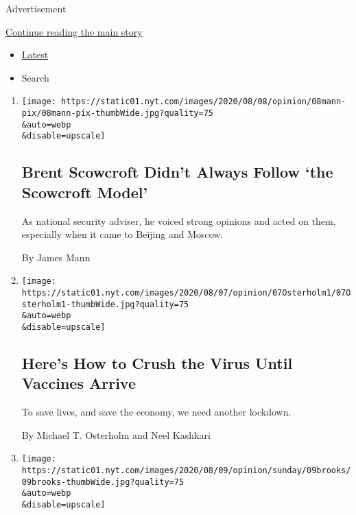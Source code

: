 Advertisement

\protect\hyperlink{after-mid1}{Continue reading the main story}

\begin{itemize}
\tightlist
\item
  \protect\hyperlink{stream-panel}{Latest}
\item
  Search
\end{itemize}

\begin{enumerate}
\def\labelenumi{\arabic{enumi}.}
\item
  \href{/2020/08/08/opinion/brent-scowcroft-model-foreign-policy.html}{}

  \texttt{[image: https://static01.nyt.com/images/2020/08/08/opinion/08mann-pix/08mann-pix-thumbWide.jpg?quality=75\\\&auto=webp\\\&disable=upscale]}

  \hypertarget{brent-scowcroft-didnt-always-follow-the-scowcroft-model}{%
  \subsection{Brent Scowcroft Didn't Always Follow `the Scowcroft
  Model'}\label{brent-scowcroft-didnt-always-follow-the-scowcroft-model}}

  As national security adviser, he voiced strong opinions and acted on
  them, especially when it came to Beijing and Moscow.

  By James Mann
\item
  \href{/2020/08/07/opinion/coronavirus-lockdown-unemployment-death.html}{}

  \texttt{[image: https://static01.nyt.com/images/2020/08/07/opinion/07Osterholm1/07Osterholm1-thumbWide.jpg?quality=75\\\&auto=webp\\\&disable=upscale]}

  \hypertarget{heres-how-to-crush-the-virus-until-vaccines-arrive}{%
  \subsection{Here's How to Crush the Virus Until Vaccines
  Arrive}\label{heres-how-to-crush-the-virus-until-vaccines-arrive}}

  To save lives, and save the economy, we need another lockdown.

  By Michael T. Osterholm and Neel Kashkari
\item
  \href{/2020/08/07/opinion/sunday/republican-party-trump-2020.html}{}

  \texttt{[image: https://static01.nyt.com/images/2020/08/09/opinion/sunday/09brooks/09brooks-thumbWide.jpg?quality=75\\\&auto=webp\\\&disable=upscale]}


\end{enumerate}

